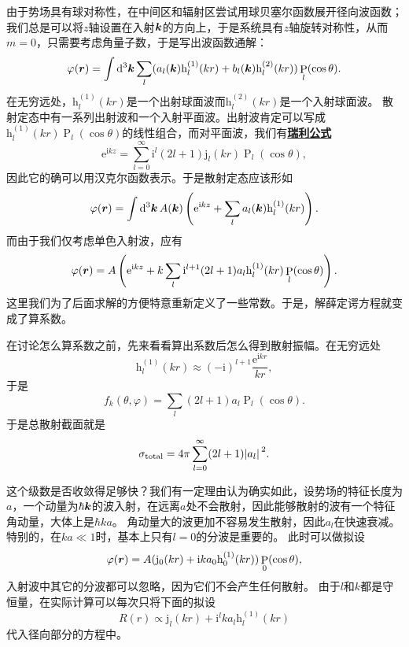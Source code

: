 \documentclass[UTF8, a4paper]{ctexart}
\newcommand*{\ee}{\mathrm{e}}
\newcommand*{\ii}{\mathrm{i}}
\DeclareMathOperator{\legpoly}{P}
\newcommand*{\hankelone}{\mathrm{h}^{(1)}}
\newcommand*{\hankeltwo}{\mathrm{h}^{(2)}}
\newcommand{\concept}[1]{\underline{\textbf{#1}}}
\begin{document}
由于势场具有球对称性，在中间区和辐射区尝试用球贝塞尔函数展开径向波函数；我们总是可以将$z$轴设置在入射$\vb*{k}$的方向上，于是系统具有$z$轴旋转对称性，从而$m=0$，只需要考虑角量子数，于是写出波函数通解：
\[
    \varphi(\vb*{r}) = \int \dd[3]{\vb*{k}} \sum_{l} (a_l(\vb*{k}) \hankelone_l(kr) + b_l(\vb*{k}) \hankeltwo_l(kr)) \legpoly_l(\cos \theta).
\]
在无穷远处，$\hankelone_l(kr)$是一个出射球面波而$\hankeltwo_l(kr)$是一个入射球面波。
散射定态中有一系列出射波和一个入射平面波。出射波肯定可以写成$\hankelone_l(kr) \legpoly_l (\cos \theta)$的线性组合，而对平面波，我们有\concept{瑞利公式}
\begin{equation}
    \ee^{\ii k z} = \sum_{l=0}^\infty \ii^l (2l+1) \mathrm{j}_l (kr) \legpoly_l(\cos \theta),
\end{equation}
因此它的确可以用汉克尔函数表示。于是散射定态应该形如
\[
    \varphi(\vb*{r}) = \int \dd[3]{\vb*{k}} A(\vb*{k}) \left( \ee^{\ii k z} + \sum_l a_l(\vb*{k}) \hankelone_l(kr)  \right).
\]
而由于我们仅考虑单色入射波，应有
\begin{equation}
    \varphi(\vb*{r}) = A\left( \ee^{\ii k z} + k \sum_l \ii^{l+1} (2l+1) a_l \hankelone_l(kr) \legpoly_l(\cos \theta) \right).
\end{equation}
这里我们为了后面求解的方便特意重新定义了一些常数。于是，解薛定谔方程就变成了算系数。

在讨论怎么算系数之前，先来看看算出系数后怎么得到散射振幅。在无穷远处
\[
    \hankelone_l(kr) \approx (-\ii)^{l+1} \frac{\ee^{\ii k r}}{kr},
\]
于是
\begin{equation}
    f_k(\theta, \varphi) = \sum_l (2l+1) a_l \legpoly_l(\cos \theta).
    \label{eq:scattering-amp}
\end{equation}
于是总散射截面就是
\begin{equation}
    \sigma_\text{total} = 4\pi \sum_{l=0}^\infty (2l+1) \abs*{a_l}^2. 
\end{equation}

这个级数是否收敛得足够快？我们有一定理由认为确实如此，设势场的特征长度为$a$，一个动量为$\hbar \vb*{k}$的波入射，在远离$a$处不会散射，因此能够散射的波有一个特征角动量，大体上是$\hbar k a$。
角动量大的波更加不容易发生散射，因此$a_l$在快速衰减。特别的，在$k a \ll 1$时，基本上只有$l=0$的分波是重要的。
此时可以做拟设
\begin{equation}
    \varphi(\vb*{r}) = A (\mathrm{j}_0(kr) + \ii k a_0 \hankelone_0(kr)) \legpoly_0(\cos \theta),
\end{equation}
入射波中其它的分波都可以忽略，因为它们不会产生任何散射。
由于$l$和$k$都是守恒量，在实际计算可以每次只将下面的拟设
\begin{equation}
    R(r) \propto \mathrm{j}_l (kr) + \ii^{l} k a_l \hankelone_l(kr)
\end{equation}
代入径向部分的方程中。
\end{document}
